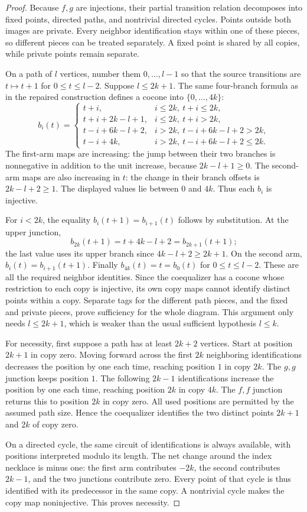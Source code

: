 \begin{proof}
Because $f,g$ are injections, their partial transition relation
decomposes into fixed points, directed paths, and nontrivial
directed cycles. Points outside both images are private. Every
neighbor identification stays within one of these pieces, so
different pieces can be treated separately. A fixed point is
shared by all copies, while private points remain separate.

On a path of $l$ vertices, number them $0,\ldots,l-1$ so that
the source transitions are $t\mapsto t+1$ for
$0\leq t\leq l-2$. Suppose $l\leq2k+1$. The same four-branch
formula as in the repaired construction defines a cocone into
$\{0,\ldots,4k\}$:
\[
 b_i(t)=
 \begin{cases}
 t+i,&i\leq2k,\ t+i\leq2k,\\
 t+i+2k-l+1,&i\leq2k,\ t+i>2k,\\
 t-i+6k-l+2,&i>2k,\ t-i+6k-l+2>2k,\\
 t-i+4k,&i>2k,\ t-i+6k-l+2\leq2k.
 \end{cases}
\]
The first-arm maps are increasing: the jump between their two
branches is nonnegative in addition to the unit increase,
because $2k-l+1\geq0$. The second-arm maps are also increasing
in $t$: the change in their branch offsets is
$2k-l+2\geq1$. The displayed values lie between $0$ and $4k$.
Thus each $b_i$ is injective.

For $i<2k$, the equality $b_i(t+1)=b_{i+1}(t)$ follows by
substitution. At the upper junction,
\[
       b_{2k}(t+1)=t+4k-l+2=b_{2k+1}(t+1);
\]
the last value uses its upper branch since
$4k-l+2\geq2k+1$. On the second arm,
$b_i(t)=b_{i+1}(t+1)$. Finally
$b_{4k}(t)=t=b_0(t)$ for $0\leq t\leq l-2$.
These are all the required neighbor identities. Since the
coequalizer has a cocone whose restriction to each copy is
injective, its own copy maps cannot identify distinct points
within a copy. Separate tags for the different path pieces,
and the fixed and private pieces, prove sufficiency for the
whole diagram. This argument only needs $l\leq2k+1$, which is
weaker than the usual sufficient hypothesis $l\leq k$.

For necessity, first suppose a path has at least $2k+2$ vertices.
Start at position $2k+1$ in copy zero. Moving forward across the
first $2k$ neighboring identifications decreases the position
by one each time, reaching position $1$ in copy $2k$.
The $g,g$ junction keeps position $1$. The following $2k-1$
identifications increase the position by one each time, reaching
position $2k$ in copy $4k$. The $f,f$ junction returns this to
position $2k$ in copy zero. All used positions are permitted by
the assumed path size. Hence the coequalizer identifies the two
distinct points $2k+1$ and $2k$ of copy zero.

On a directed cycle, the same circuit of identifications is
always available, with positions interpreted modulo its length.
The net change around the index necklace is minus one: the first
arm contributes $-2k$, the second contributes $2k-1$, and the two
junctions contribute zero. Every point of that cycle is thus
identified with its predecessor in the same copy. A nontrivial
cycle makes the copy map noninjective. This proves necessity.
\end{proof}

